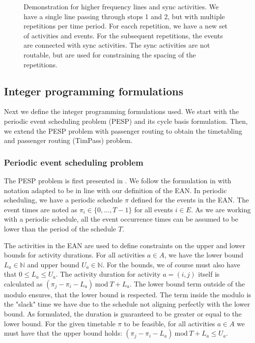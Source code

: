 \documentclass[english, 12pt, a4paper, sci, utf8, a-2b, online]{aaltothesis}
\newcommand{\N}{\mathbb{N}}
\begin{document}
\begin{figure}[t]
    \centering
    
    \caption{Demonstration for higher frequency lines and sync activities. We have a single line passing through stops 1 and 2, but with multiple repetitions per time period. For eacch repetition, we have a new set of activities and events. For the subsequent repetitions, the events are connected with sync activities. The sync activities are not routable, but are used for constraining the spacing of the repetitions.}
    \label{fig:sync-demo}
\end{figure}

\subsection{Integer programming formulations}
\label{sec:ips}

Next we define the integer programming formulations used. We start with the periodic event scheduling problem (PESP) and its cycle basis formulation. Then, we extend the PESP problem with passenger routing to obtain the timetabling and passenger routing (TimPass) problem.

\subsubsection{Periodic event scheduling problem}

The PESP problem is first presented in \cite{pesp-original-1989}. We  follow the formulation in \cite{schiewe2020periodic} with notation adapted to be in line with our definition of the EAN. In periodic scheduling, we have a periodic schedule $\pi$ defined for the events in the EAN. The event times are noted as $\pi_i \in \{0, \dots, T-1\}$ for all events $i \in E$. As we are working with a periodic schedule, all the event occurrence times can be assumed to be lower than the period of the schedule $T$. %

The activities in the EAN are used to define constraints on the upper and lower bounds for activity durations. For all activities $a \in A$, we have the lower bound $L_a \in \N$ and upper bound $U_a \in \N$. For the bounds, we of course must also have that $0 \leq L_a \leq U_a$. The activity duration for activity $a = (i, j)$ itself is calculated as $(\pi_j - \pi_i - L_a)\ \text{mod}\ T + L_a$. The lower bound term outside of the modulo ensures, that the lower bound is respected. The term inside the modulo is the "slack" time we have due to the schedule not aligning perfectly with the lower bound. As formulated, the duration is guaranteed to be greater or equal to the lower bound. For the given timetable $\pi$ to be feasible, for all activities $a \in A$ we must have that the upper bound holds: $(\pi_j - \pi_i - L_a)\ \text{mod}\ T + L_a\leq U_a$.
\end{document}
